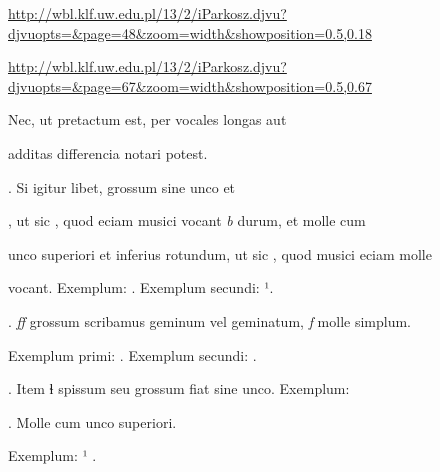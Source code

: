 
\newParkoszpage


{
\url{http://wbl.klf.uw.edu.pl/13/2/iParkosz.djvu?djvuopts=&page=48&zoom=width&showposition=0.5,0.18}

\url{http://wbl.klf.uw.edu.pl/13/2/iParkosz.djvu?djvuopts=&page=67&zoom=width&showposition=0.5,0.67}
}


\fullpreviouslines


{
\color{blue}
Nec, ut pretactum est, per vocales longas aut

}



\splitlines

additas differencia notari potest.

\indentP {}. Si igitur libet,   grossum sine unco et 

\fulllines

, ut sic , quod eciam musici vocant \textit{b} durum, et  molle cum

unco superiori et inferius rotundum, ut sic , quod musici eciam  molle


vocant. Exemplum:   . Exemplum secundi:   ¹.

. \textit{ﬀ} grossum scribamus geminum vel geminatum, \textit{f} molle simplum.

Exemplum primi:   . Exemplum secundi:  .

. Item ɬ spissum seu grossum fiat sine unco. Exemplum:   

    . Molle cum unco superiori.


\splitlines
Exemplum:    ¹  .

